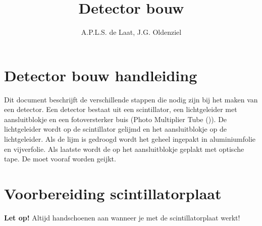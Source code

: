 

\title{Detector bouw}
\author{A.P.L.S. de Laat, J.G. Oldenziel} 



\maketitle

\section{Detector bouw handleiding}

Dit document beschrijft de verschillende stappen die nodig zijn bij het
maken van een \hisparc detector. Een detector bestaat uit een
scintillator, een lichtgeleider met aansluitblokje en een fotoversterker
buis (Photo Multiplier Tube (\pmt)). De lichtgeleider wordt op de
scintillator gelijmd en het aansluitblokje op de lichtgeleider. Als de
lijm is gedroogd wordt het geheel ingepakt in aluminiumfolie en
vijverfolie. Als laatste wordt de \pmt op het aansluitblokje geplakt met
optische tape. De \pmt moet vooraf worden geijkt.


\section{Voorbereiding scintillatorplaat}

\textbf{Let op!} Altijd handschoenen aan wanneer je met de
scintillatorplaat werkt!

